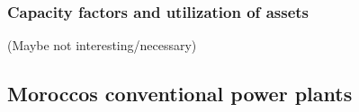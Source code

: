 \subsubsection{Capacity factors and utilization of assets}
(Maybe not interesting/necessary)





\subsection{Moroccos conventional power plants}

\clearpage
\onecolumn
\begin{footnotesize}
    
\end{footnotesize}
\clearpage
\twocolumn
